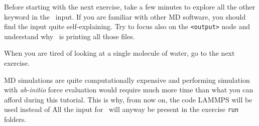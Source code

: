 \documentclass{article}
\begin{document}
Before starting with the next exercise, take a few minutes to explore
all the other keyword in the \ipi\ input. If you are familiar with
other MD software, you should find the input quite self-explaining.
Try to focus also on the \texttt{<output>} node and understand why
\ipi\ is printing all those files.


When you are tired of looking at a single molecule of water, go to the
next exercise.

MD simulations are quite computationally expensive and performing
simulation with \emph{ab-initio} force evaluation would require much
more time than what you can afford during this tutorial. This is why,
from now on, the code LAMMPS will be used instead of \qe\. All the
input for \qe\ will anyway be present in the exercise \texttt{run} folders.

\vspace{2em}
\end{document}
